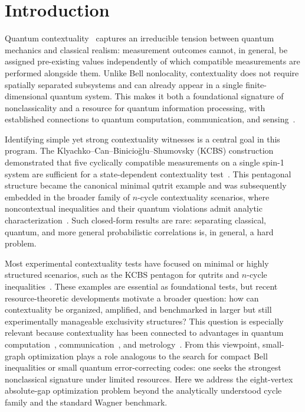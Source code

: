 \documentclass[aps,pra,twocolumn,superscriptaddress,longbibliography,floatfix]{revtex4-2}
\begin{document}
\maketitle

\section{Introduction}

Quantum contextuality~\cite{KochenSpecker1967} captures an irreducible
tension between quantum mechanics and classical realism: measurement outcomes
cannot, in general, be assigned pre-existing values independently of which
compatible measurements are performed alongside them.
Unlike Bell nonlocality, contextuality does not require spatially separated
subsystems and can already appear in a single finite-dimensional quantum
system. This makes it both a foundational signature of nonclassicality and a
resource for quantum information processing, with established connections to
quantum computation, communication, and
sensing~\cite{Budroni2022,Howard2014,Raussendorf2013}.

Identifying simple yet strong contextuality witnesses is a central goal in
this program. The Klyachko--Can--Binicioğlu--Shumovsky (KCBS) construction
demonstrated that five cyclically compatible measurements on a single spin-1
system are sufficient for a state-dependent contextuality
test~\cite{Klyachko2002,Klyachko2008}. This pentagonal structure became the canonical
minimal qutrit example and was subsequently embedded in the broader family
of $n$-cycle contextuality scenarios, where noncontextual inequalities and
their quantum violations admit analytic characterization~\cite{Araujo2013}.
Such closed-form results are rare: separating classical, quantum, and more
general probabilistic correlations is, in general, a hard problem.

Most experimental contextuality tests have focused on minimal or highly
structured scenarios, such as the KCBS pentagon for qutrits and $n$-cycle
inequalities~\cite{Araujo2013}.
These examples are essential as foundational tests, but recent
resource-theoretic developments motivate a broader question: how can
contextuality be organized, amplified, and benchmarked in larger but still
experimentally manageable exclusivity structures?
This question is especially relevant because contextuality has been connected
to advantages in quantum computation~\cite{Howard2014,Raussendorf2013},
communication~\cite{Gupta2023}, and metrology~\cite{Lostaglio2020}.
From this viewpoint, small-graph optimization plays a role analogous to the
search for compact Bell inequalities or small quantum error-correcting codes:
one seeks the strongest nonclassical signature under limited resources.
Here we address the eight-vertex absolute-gap optimization problem beyond
the analytically understood cycle family and the standard Wagner
benchmark.
\end{document}
